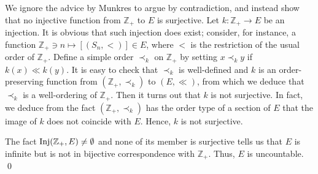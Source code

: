 \documentclass[a4paper,12pt]{article}
\begin{document}
\begin{sol}
	We ignore the advice by Munkres to argue by contradiction,
	and instead show that no injective function from
	\( \mathbb{Z}_{+} \) to \( E \) is surjective.
	Let \( k:\mathbb{Z}_{+} \to E \) be an injection.
	It is obvious that such injection does exist;
	consider, for instance, a function
	\( \mathbb{Z}_{+} \ni n \mapsto \left[ (S_n,<)\right] \in E\),
	where \( < \) is the restriction of the usual order of \( \mathbb{Z}_{+} \).
	Define a simple order \( \prec_{k} \) on \( \mathbb{Z}_{+} \) by setting
	\( x \prec_{k} y \) if \( k(x) \ll k(y) \).
	It is easy to check that \( \prec_{k} \) is well-defined and \( k \) is an order-preserving function from \( (\mathbb{Z}_{+}, \prec_{k}) \) to \( (E ,\ll) \),
	from which we deduce that
	\( \prec_{k} \) is a well-ordering of \( \mathbb{Z}_{+} \).
	Then it turns out that \( k \) is not surjective.
	In fact, we deduce from the fact \( (\mathbb{Z}_{+},\prec_{k}) \) has the order type of a section of \( E \) that
	the image of \( k \) does not coincide with \( E \).
	Hence, \( k \) is not surjective.
	
	The fact
	\( \mathrm{Inj}(\mathbb{Z}_{+},E)\neq \emptyset \)
	and none of its member is surjective
	tells us that \( E \) is infinite but is not in bijective correspondence with \( \mathbb{Z}_{+} \).
	Thus,
	\( E \) is uncountable.
	\qed\end{sol}
\end{document}
